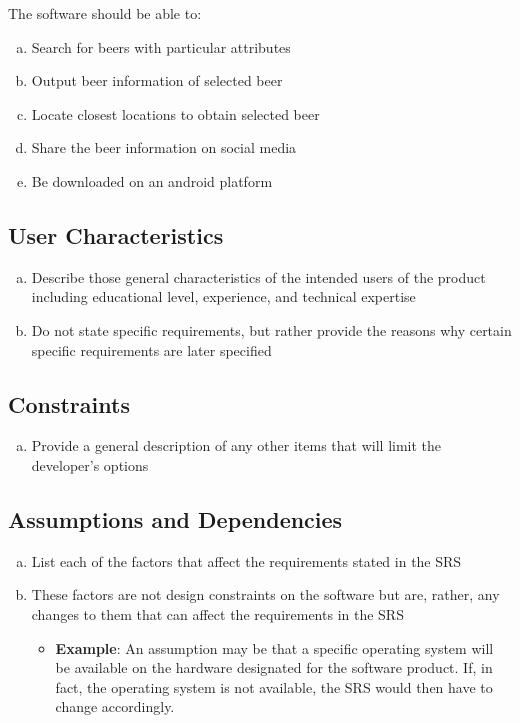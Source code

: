 \documentclass[]{article}
\begin{document}
The software should be able to:
\begin{enumerate}[a)]

\item Search for beers with particular attributes
\item Output beer information of selected beer
\item Locate closest locations to obtain selected beer
\item Share the beer information on social media 
\item Be downloaded on an android platform
	
	
\end{enumerate}

\subsection{User Characteristics}
\label{sub:user_characteristics}
\begin{enumerate}[a)]
	\item Describe those general characteristics of the intended users of the product including educational level, experience, and technical expertise
	\item Do not state specific requirements, but rather provide the reasons why certain specific requirements are later specified
\end{enumerate}

\subsection{Constraints}
\label{sub:constraints}
\begin{enumerate}[a)]
	\item Provide a general description of any other items that will limit the developer's options
\end{enumerate}

\subsection{Assumptions and Dependencies}
\label{sub:assumptions_and_dependencies}
\begin{enumerate}[a)]
	\item List each of the factors that affect the requirements stated in the SRS
	\item These factors are not design constraints on the software but are, rather, any changes to them that can affect the requirements in the SRS
	\begin{itemize}
		\item \textbf{Example}: An assumption may be that a specific operating system will be available on the hardware designated for the software product. If, in fact, the operating system is not available, the SRS would then have to change accordingly.
	\end{itemize}
\end{enumerate}
\end{document}
